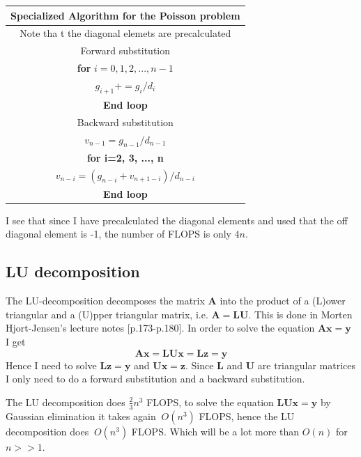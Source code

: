 \documentclass[12pt]{article}
\begin{document}
\begin{center}
  \begin{tabular}{||c||}
    \hline\hline
    \textbf{Specialized Algorithm for the Poisson problem}\\
    \hline\hline Note tha
    t the diagonal elemets are precalculated\\
    Forward substitution \\
    \textbf{for} $i=0,1,2,...,n-1$\\
      $g_{i+1}+=g_i/d_i$\\
      \textbf{End loop} \\
      Backward substitution \\
      $v_{n-1}=g_{n-1}/d_{n-1}$\\
      \textbf{for i=2, 3, ..., n} \\
      $v_{n-i}=(g_{n-i}+v_{n+1-i})/d_{n-i}$\\ 
      \textbf{End loop}\\
      \hline\hline
  \end{tabular}
\end{center}
 I see that since I have precalculated the diagonal elements and used that the off diagonal element is -1, the number of FLOPS is only $4n$.

\subsection{LU decomposition}
The LU-decomposition decomposes the matrix $\mathbf{A}$ into the product of a (L)ower triangular and a (U)pper triangular matrix, i.e. $\mathbf{A}=\mathbf{L}\mathbf{U}$. This is done in Morten Hjort-Jensen's lecture notes \cite{morten}[p.173-p.180]. In order to solve the equation $\mathbf{A}\mathbf{x}=\mathbf{y}$ I get $$\mathbf{A}\mathbf{x}=\mathbf{L}\mathbf{U}\mathbf{x}=\mathbf{L}\mathbf{z}=\mathbf{y} $$
Hence I need to solve $\mathbf{L}\mathbf{z}=\mathbf{y}$ and $\mathbf{U}\mathbf{x}=\mathbf{z}$. Since $\mathbf{L}$ and $\mathbf{U}$ are triangular matrices I only need to do a forward substitution and a backward substitution. 

The LU decomposition does $\frac{2}{3}n^3$ FLOPS, to solve the equation $\mathbf{L}\mathbf{U}\mathbf{x}=\mathbf{y}$ by Gaussian elimination it takes again $~O(n^3)$ FLOPS, hence the LU decomposition does $~O(n^3)$ FLOPS. Which will be a lot more than $O(n)$ for $n>>1$.
\end{document}

